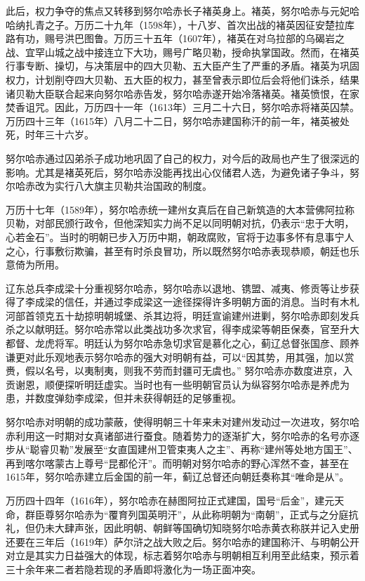 此后，权力争夺的焦点又转移到努尔哈赤长子褚英身上。褚英，努尔哈赤与元妃哈哈纳扎青之子。万历二十九年（1598年），十八岁、首次出战的褚英因征安楚拉库路有功，赐号洪巴图鲁。万历三十五年（1607年），褚英在对乌拉部的乌碣岩之战、宜罕山城之战中接连立下大功，赐号广略贝勒，授命执掌国政。然而，在褚英行事专断、操切，与决策层中的四大贝勒、五大臣产生了严重的矛盾。褚英为巩固权力，计划削夺四大贝勒、五大臣的权力，甚至曾表示即位后会将他们诛杀，结果诸贝勒大臣联合起来向努尔哈赤告发，努尔哈赤遂开始冷落褚英。褚英愤恨，在家焚香诅咒。因此，万历四十一年（1613年）三月二十六日，努尔哈赤将褚英囚禁。万历四十三年（1615年）八月二十二日，努尔哈赤建国称汗的前一年，褚英被处死，时年三十六岁。

努尔哈赤通过囚弟杀子成功地巩固了自己的权力，对今后的政局也产生了很深远的影响。尤其是褚英死后，努尔哈赤没能再找出心仪储君人选，为避免诸子争斗，努尔哈赤改为实行八大旗主贝勒共治国政的制度。

万历十七年（1589年），努尔哈赤统一建州女真后在自己新筑造的大本营佛阿拉称贝勒，对部民颁行政令，但他深知实力尚不足以同明朝对抗，仍表示“忠于大明，心若金石”。当时的明朝已步入万历中期，朝政腐败，官将于边事多怀有息事宁人之心，行事敷衍欺骗，甚至有时杀良冒功，所以既然努尔哈赤表现恭顺，朝廷也乐意倚为所用。

辽东总兵李成梁十分重视努尔哈赤，努尔哈赤以退地、镌盟、减夷、修贡等让步获得了李成梁的信任，并通过李成梁这一途径探得许多明朝方面的消息。当时有木札河部首领克五十劫掠明朝城堡、杀其边将，明廷宣谕建州进剿，努尔哈赤即刻发兵杀之以献明廷。努尔哈赤常以此类战功多次求官，得李成梁等朝臣保奏，官至升大都督、龙虎将军。明廷认为努尔哈赤急切求官是慕化之心，蓟辽总督张国彦、顾养谦更对此乐观地表示努尔哈赤的强大对明朝有益，可以“因其势，用其强，加以赏赉，假以名号，以夷制夷，则我不劳而封疆可无虞也。” 努尔哈赤亦数度进京，入贡谢恩，顺便探听明廷虚实。当时也有一些明朝官员认为纵容努尔哈赤是养虎为患，并数度弹劾李成梁，但并未获得朝廷的足够重视。

努尔哈赤对明朝的成功蒙蔽，使得明朝三十年来未对建州发动过一次进攻，努尔哈赤利用这一时期对女真诸部进行蚕食。随着势力的逐渐扩大，努尔哈赤的名号亦逐步从“聪睿贝勒”发展至“女直国建州卫管束夷人之主”、再称“建州等处地方国王”、再到喀尔喀蒙古上尊号“昆都伦汗”。而明朝对努尔哈赤的野心浑然不查，甚至在1615年，努尔哈赤建立后金国的前一年，蓟辽总督还向朝廷奏称其“唯命是从”。

万历四十四年（1616年），努尔哈赤在赫图阿拉正式建国，国号“后金”，建元天命，群臣尊努尔哈赤为“覆育列国英明汗”，从此称明朝为“南朝”，正式与之分庭抗礼，但仍未大肆声张，因此明朝、朝鲜等国确切知晓努尔哈赤黄衣称朕并记入史册还要在三年后（1619年）萨尔浒之战大败之后。努尔哈赤的建国称汗、与明朝公开对立是其实力日益强大的体现，标志着努尔哈赤与明朝相互利用至此结束，预示着三十余年来二者若隐若现的矛盾即将激化为一场正面冲突。

